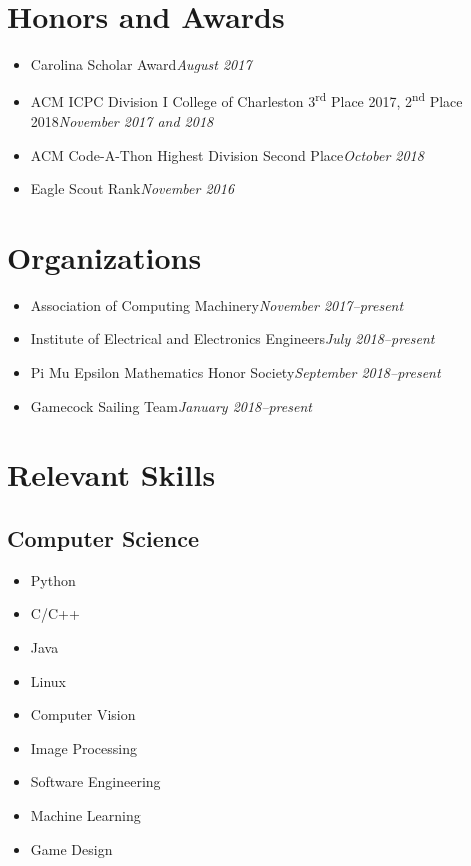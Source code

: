 \documentclass[10pt,letterpaper,roman]{moderncv}
\renewcommand{\cvitem}[2]{\item {#1}\hfill\textit{#2}}
\newcommand{\nd}{\textsuperscript{nd}\xspace}
\newcommand{\rd}{\textsuperscript{rd}\xspace}
\begin{document}
\section{\textbf{Honors and Awards}}
\begin{itemize}
  \cvitem{Carolina Scholar Award}{August 2017}
  \cvitem{ACM ICPC Division I College of Charleston 3\rd Place 2017, 2\nd Place 2018}{November 2017 and 2018}
  \cvitem{ACM Code-A-Thon Highest Division Second Place}{October 2018}
  \cvitem{Eagle Scout Rank}{November 2016}
\end{itemize}

\section{\textbf{Organizations}}
\begin{itemize}
  \cvitem{Association of Computing Machinery}{November 2017--present}
  \cvitem{Institute of Electrical and Electronics Engineers}{July 2018--present}
  \cvitem{Pi Mu Epsilon Mathematics Honor Society}{September 2018--present}
  \cvitem{Gamecock Sailing Team}{January 2018--present}

\end{itemize}

\section{Relevant Skills}
\subsection{Computer Science}
\vspace{-\topsep}
\begin{multicols}{3}
\begin{itemize}
  \item Python
  \item C/C++
  \item Java
  \item Linux
  \item Computer Vision
  \item Image Processing
  \item Software Engineering
  \item Machine Learning
  \item Game Design
\end{itemize}
\end{multicols}
\end{document}
